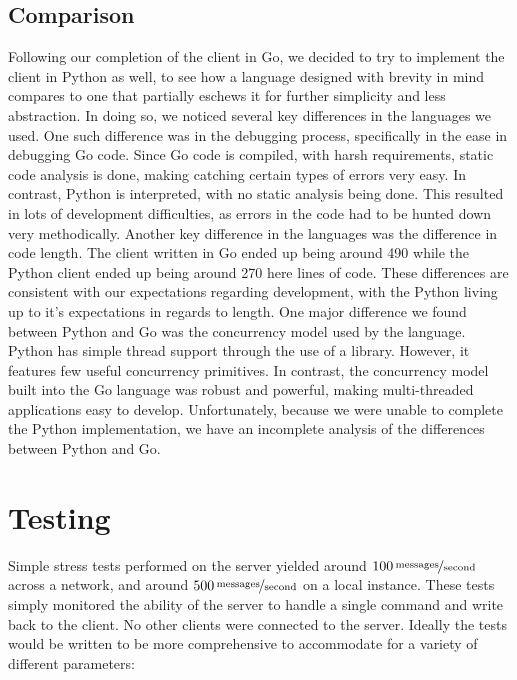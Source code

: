 \documentclass[12pt, letterpaper]{article}
\begin{document}
\subsection*{Comparison}

Following our completion of the client in Go, we decided to try to 
implement the client in Python as well, to see how a language designed 
with brevity in mind compares to one that partially eschews it for 
further simplicity and less abstraction. In doing so, we noticed 
several key differences in the languages we used. One such difference 
was in the debugging process, specifically in the ease in debugging Go 
code. Since Go code is compiled, with harsh requirements, static code 
analysis is done, making catching certain types of errors very easy. In 
contrast, Python is interpreted, with no static analysis being done. 
This resulted in lots of development difficulties, as errors in the 
code had to be hunted down very methodically. Another key difference in 
the languages was the difference in code length. The client written in 
Go ended up being around 490 %
while the Python client ended up being around 270  %
here lines of code. These differences are consistent with our 
expectations regarding development, with the Python living up to it's 
expectations in regards to length. One major difference we found 
between Python and Go was the concurrency model used by the language. 
Python has simple thread support through the use of a library. However, 
it features few useful concurrency primitives. In contrast, the 
concurrency model built into the Go language was robust and powerful, 
making multi-threaded applications easy to develop. Unfortunately, 
because we were unable to complete the Python implementation, we have 
an incomplete analysis of the differences between Python and Go.

\section*{Testing}

Simple stress tests performed on the server yielded around 
$\unitfrac[100]{messages}{second}$ across a network, and around 
$\unitfrac[500]{messages}{second}$ on a local instance. These tests 
simply monitored the ability of the server to handle a single command 
and write back to the client. No other clients were connected to the 
server. Ideally the tests would be written to be more comprehensive to 
accommodate for a variety of different parameters:
\end{document}
